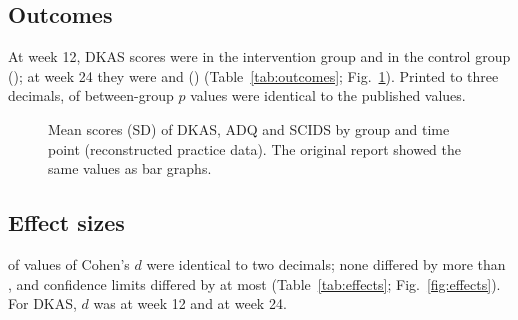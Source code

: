 \documentclass[pdflatex,sn-vancouver-num,referee,lineno]{sn-jnl}
\begin{document}
\begin{table}[htbp]
\centering
\caption{Baseline characteristics (reconstructed practice data). Published $p$: original report. Reproduced $p$: Student's $t$ test for age and years worked; Fisher's exact test for sex, marital status, job and in-service training; likelihood-ratio $\chi^2$ test for education and dementia training.}
\label{tab:baseline}
\small

\end{table}

\subsection{Outcomes}
At week 12, DKAS scores were \DKASIntTOneMean{} in the intervention group and \DKASCtlTOneMean{} in the control group (\DKASTOnePstat{}); at week 24 they were \DKASIntTTwoMean{} and \DKASCtlTTwoMean{} (\DKASTTwoPstat{}) (Table~\ref{tab:outcomes}; Fig.~\ref{fig:outcomes}). Printed to three decimals, \PMatch{} of \PTotal{} between-group $p$ values were identical to the published values.\PDiffSentence{}

\begin{table}[htbp]
\centering
\caption{Scores at baseline, week 12 and week 24 (reconstructed practice data). Means and SDs agree with the published Table 2 by construction; the $p$ values ($t$ test) are recomputed from the data.}
\label{tab:outcomes}
\small

\end{table}

\begin{figure}[tbp]
\centering

\caption{Mean scores (SD) of DKAS, ADQ and SCIDS by group and time point (reconstructed practice data). The original report showed the same values as bar graphs.}
\label{fig:outcomes}
\end{figure}

\subsection{Effect sizes}
\DMatch{} of \DTotal{} values of Cohen's $d$ were identical to two decimals; none differed by more than \DMaxDiff{}, and confidence limits differed by at most \CIMaxDiff{} (Table~\ref{tab:effects}; Fig.~\ref{fig:effects}). For DKAS, $d$ was \DKASTOneD{} at week 12 and \DKASTTwoD{} at week 24.

\begin{table}[htbp]
\centering
\caption{Cohen's $d$ (95\% CI) for the intervention versus the control group: values printed in the original report and values reproduced from the practice data.}
\label{tab:effects}
\small

\end{table}
\end{document}
